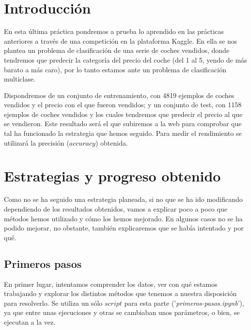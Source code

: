 \documentclass[11pt,a4paper]{article}
\begin{document}
\newpage

\tableofcontents
\thispagestyle{empty}				%

\newpage

\setlength{\parskip}{1em}



\section{Introducción}

En esta última práctica pondremos a prueba lo aprendido en las prácticas anteriores a través de una competición en la plataforma
Kaggle. En ella se nos plantea un problema de clasificación de una serie de coches vendidos, donde tendremos que predecir la
categoría del precio del coche (del 1 al 5, yendo de más barato a más caro), por lo tanto estamos ante un problema de clasificación
multiclase.

Dispondremos de un conjunto de entrenamiento, con 4819 ejemplos de coches vendidos y el precio con el que fueron vendidos; y un
conjunto de test, con 1158 ejemplos de coches vendidos y los cuales tendremos que predecir el precio al que se vendieron. Este
resultado será el que subiremos a la web para comprobar que tal ha funcionado la estrategia que hemos seguido. Para medir el
rendimiento se utilizará la precisión ($accuracy$) obtenida.


\section{Estrategias y progreso obtenido}

Como no se ha seguido una estrategia planeada, si no que se ha ido modificando dependiendo de los resultados obtenidos, vamos a
explicar poco a poco que métodos hemos utilizado y cómo los hemos mejorado. En algunos casos no se ha podido mejorar, no obstante,
también explicaremos que se había intentado y por qué.

\subsection{Primeros pasos}

En primer lugar, intentamos comprender los datos, ver con qué estamos trabajando y explorar los distintos métodos que tenemos a
nuestra disposición para resolverlo. Se utiliza un sólo $script$ para esta parte ('\textit{primeros-pasos.ipynb}'), ya que entre
unas ejecuciones y otras se cambiaban unos parámetros, o bien, se ejecutan a la vez.
\end{document}
